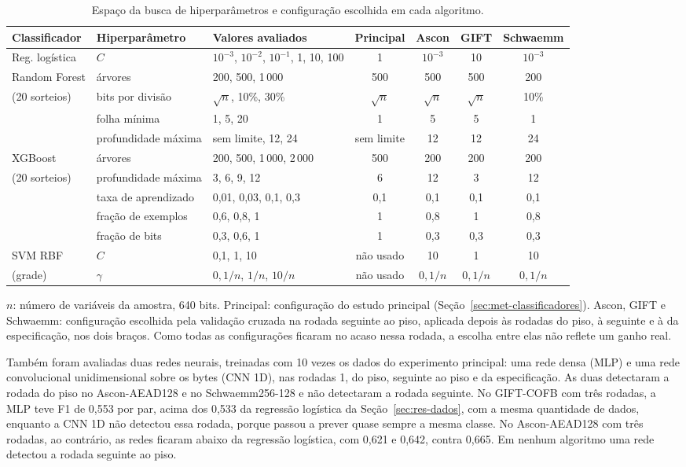 \begin{table}[htb]
\centering
\caption{Espaço da busca de hiperparâmetros e configuração escolhida em cada algoritmo.}
\label{tab:res-hiperparametros}
\footnotesize
\setlength{\tabcolsep}{2pt}
\begin{tabular}{lllcccc}
\toprule
Classificador & Hiperparâmetro & Valores avaliados & Principal & Ascon & GIFT & Schwaemm \\
\midrule
Reg. logística & $C$ & $10^{-3}$, $10^{-2}$, $10^{-1}$, 1, 10, 100 & 1 & $10^{-3}$ & 10 & $10^{-3}$ \\
\midrule
Random Forest & árvores & 200, 500, 1\,000 & 500 & 500 & 500 & 200 \\
(20 sorteios) & bits por divisão & $\sqrt{n}$, 10\%, 30\% & $\sqrt{n}$ & $\sqrt{n}$ & $\sqrt{n}$ & 10\% \\
 & folha mínima & 1, 5, 20 & 1 & 5 & 5 & 1 \\
 & profundidade máxima & sem limite, 12, 24 & sem limite & 12 & 12 & 24 \\
\midrule
XGBoost & árvores & 200, 500, 1\,000, 2\,000 & 500 & 200 & 200 & 200 \\
(20 sorteios) & profundidade máxima & 3, 6, 9, 12 & 6 & 12 & 3 & 12 \\
 & taxa de aprendizado & 0,01, 0,03, 0,1, 0,3 & 0,1 & 0,1 & 0,1 & 0,1 \\
 & fração de exemplos & 0,6, 0,8, 1 & 1 & 0,8 & 1 & 0,8 \\
 & fração de bits & 0,3, 0,6, 1 & 1 & 0,3 & 0,3 & 0,3 \\
\midrule
SVM RBF & $C$ & 0,1, 1, 10 & não usado & 10 & 1 & 10 \\
(grade) & $\gamma$ & $0{,}1/n$, $1/n$, $10/n$ & não usado & $0{,}1/n$ & $0{,}1/n$ & $0{,}1/n$ \\
\bottomrule
\end{tabular}
\par\smallskip\footnotesize $n$: número de variáveis da amostra, 640 bits. Principal: configuração do estudo principal (Seção~\ref{sec:met-classificadores}). Ascon, GIFT e Schwaemm: configuração escolhida pela validação cruzada na rodada seguinte ao piso, aplicada depois às rodadas do piso, à seguinte e à da especificação, nos dois braços. Como todas as configurações ficaram no acaso nessa rodada, a escolha entre elas não reflete um ganho real.
\end{table}

Também foram avaliadas duas redes neurais, treinadas com 10 vezes os dados do experimento principal: uma rede densa (MLP) e uma rede convolucional unidimensional sobre os bytes (CNN 1D), nas rodadas 1, do piso, seguinte ao piso e da especificação. As duas detectaram a rodada do piso no Ascon-AEAD128 e no Schwaemm256-128 e não detectaram a rodada seguinte. No GIFT-COFB com três rodadas, a MLP teve F1 de 0,553 por par, acima dos 0,533 da regressão logística da Seção~\ref{sec:res-dados}, com a mesma quantidade de dados, enquanto a CNN 1D não detectou essa rodada, porque passou a prever quase sempre a mesma classe. No Ascon-AEAD128 com três rodadas, ao contrário, as redes ficaram abaixo da regressão logística, com 0,621 e 0,642, contra 0,665. Em nenhum algoritmo uma rede detectou a rodada seguinte ao piso.

